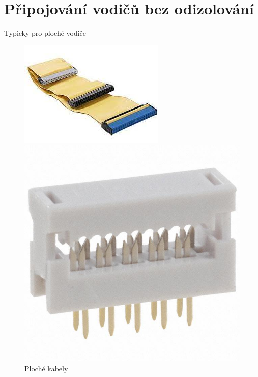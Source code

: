 \documentclass{article}
\begin{document}
\section{Připojování vodičů bez odizolování}
Typicky pro ploché vodiče

\begin{figure}[H]
  \begin{minipage}[t]{0.6\textwidth}
    \centering
    \includegraphics[width=\textwidth]{plochac1.jpg}
  \end{minipage}
  \hfil
  \begin{minipage}[t]{0.4\textwidth}
    \includegraphics[width=\textwidth]{plochac2.jpg}
    \centering
  \end{minipage}
  \caption{Ploché kabely}
\end{figure}
\end{document}
